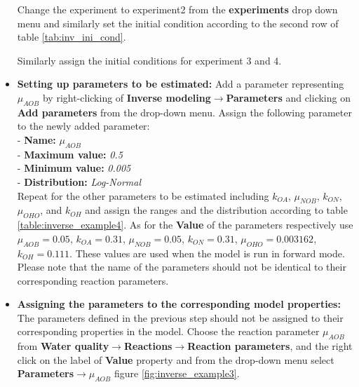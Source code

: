 \begin{itemize}
Change the experiment to experiment2 from the \textbf{experiments} drop down menu and similarly set the initial condition according to the second row of table \ref{tab:inv_ini_cond}. 

Similarly assign the initial conditions for experiment 3 and 4. 
    
    \item \textbf{Setting up parameters to be estimated: } Add a parameter representing $\mu_{AOB}$ by right-clicking of \textbf{Inverse modeling}$\rightarrow$\textbf{Parameters} and clicking on \textbf{Add parameters} from the drop-down menu. Assign the following parameter to the newly added parameter:\\
    - \textbf{Name:} $\mu_{AOB}$\\
    - \textbf{Maximum value: } \textit{0.5}\\
    - \textbf{Minimum value: } \textit{0.005}\\
    - \textbf{Distribution: } \textit{Log-Normal}\\
    Repeat for the other parameters to be estimated including $k_{OA}$, $\mu_{NOB}$, $k_{ON}$, $\mu_{OHO}$,
and $k_{OH}$ and assign the ranges and the distribution according to table \ref{table:inverse_example4}. As for the \textbf{Value} of the parameters respectively use $\mu_{AOB}=0.05$, $k_{OA}=0.31$, $\mu_{NOB}=0.05$, $k_{ON}=0.31$, $\mu_{OHO}=0.003162$, $k_{OH}=0.111$. These values are used when the model is run in forward mode. \\Please note that the name of the parameters should not be identical to their corresponding reaction parameters. \\


\item \textbf{Assigning the parameters to the corresponding model properties: } The parameters defined in the previous step should not be assigned to their corresponding properties in the model. Choose the reaction parameter $\mu_{AOB}$ from \textbf{Water quality}$\rightarrow$\textbf{Reactions}$\rightarrow$\textbf{Reaction parameters}, and the right click on the label of \textbf{Value} property and from the drop-down menu select \textbf{Parameters}$\rightarrow$\textbf{$\mu_{AOB}$} figure \ref{fig:inverse_example3}.


\end{itemize}
